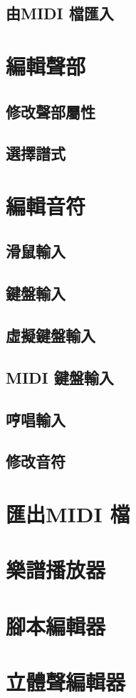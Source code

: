 \documentclass[12pt,a4paper,oneside]{report}
\begin{document}
   \subsection{由MIDI 檔匯入}
\section{編輯聲部}
   \subsection{修改聲部屬性}
   \subsection{選擇譜式}
\section{編輯音符}
   \subsection{滑鼠輸入}
   \subsection{鍵盤輸入}
   \subsection{虛擬鍵盤輸入}
   \subsection{MIDI 鍵盤輸入}
   \subsection{哼唱輸入}
   \subsection{修改音符}
\section{匯出MIDI 檔}
\section{樂譜播放器}
\section{腳本編輯器}
\section{立體聲編輯器}
\end{document}
